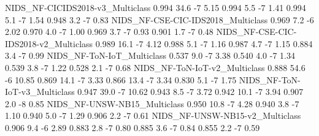 NIDS_NF-CICIDS2018-v3_Multiclass                                      0.994               34.6           -7            5.15      0.994                   5.5              -7               1.41      0.994                   5.1              -7               1.54       0.948                    3.2               -7                0.83
NIDS_NF-CSE-CIC-IDS2018_Multiclass                                    0.969                7.2           -6            2.02      0.970                   4.0              -7               1.00      0.969                   3.7              -7               0.93       0.901                    1.7               -7                0.48
NIDS_NF-CSE-CIC-IDS2018-v2_Multiclass                                 0.989               16.1           -7            4.12      0.988                   5.1              -7               1.16      0.987                   4.7              -7               1.15       0.884                    3.4               -7                0.99
NIDS_NF-ToN-IoT_Multiclass                                            0.537                9.0           -7            3.38      0.540                   4.0              -7               1.34      0.539                   3.8              -7               1.22       0.528                    2.1               -7                0.68
NIDS_NF-ToN-IoT-v2_Multiclass                                         0.888               54.6           -6           10.85      0.869                  14.1              -7               3.33      0.866                  13.4              -7               3.34       0.830                    5.1               -7                1.75
NIDS_NF-ToN-IoT-v3_Multiclass                                         0.947               39.0           -7           10.62      0.943                   8.5              -7               3.72      0.942                  10.1              -7               3.94       0.907                    2.0               -8                0.85
NIDS_NF-UNSW-NB15_Multiclass                                          0.950               10.8           -7            4.28      0.940                   3.8              -7               1.10      0.940                   5.0              -7               1.29       0.906                    2.2               -7                0.61
NIDS_NF-UNSW-NB15-v2_Multiclass                                       0.906                9.4           -6            2.89      0.883                   2.8              -7               0.80      0.885                   3.6              -7               0.84       0.855                    2.2               -7                0.59
